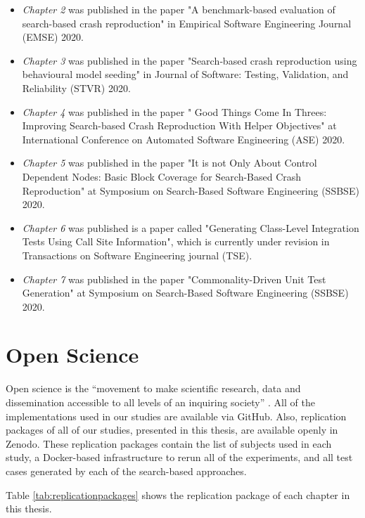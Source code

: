 \begin{itemize}
    \item \textit{Chapter 2} was published in the paper "A benchmark-based evaluation of search-based crash reproduction" in Empirical Software Engineering Journal (EMSE) 2020.
    \item \textit{Chapter 3} was published in the paper "Search‐based crash reproduction using behavioural model seeding" in Journal of Software: Testing, Validation, and Reliability (STVR) 2020.
    \item \textit{Chapter 4} was published in the paper " Good Things Come In Threes: Improving Search-based Crash Reproduction With Helper Objectives" at International Conference on Automated Software Engineering (ASE) 2020.
    \item \textit{Chapter 5} was published in the paper "It is not Only About Control Dependent Nodes: Basic Block Coverage for Search-Based Crash Reproduction" at Symposium on Search-Based Software Engineering (SSBSE) 2020.
    \item \textit{Chapter 6} was published is a paper called "Generating Class-Level Integration Tests Using Call Site Information", which is currently under revision in Transactions on Software Engineering journal (TSE).
    \item \textit{Chapter 7} was published in the paper "Commonality-Driven Unit Test Generation" at Symposium on Search-Based Software Engineering (SSBSE) 2020.
  \end{itemize}

\section{Open Science}

Open science is the “movement to make scientific research, data and dissemination accessible to all levels of an inquiring society” \cite{Open_science}. All of the implementations used in our studies are available via GitHub. Also, replication packages of all of our studies, presented in this thesis, are available openly in Zenodo. These replication packages contain the list of subjects used in each study, a Docker-based infrastructure to rerun all of the experiments, and all test cases generated by each of the search-based approaches.

Table \ref{tab:replicationpackages} shows the replication package of each chapter in this thesis.


